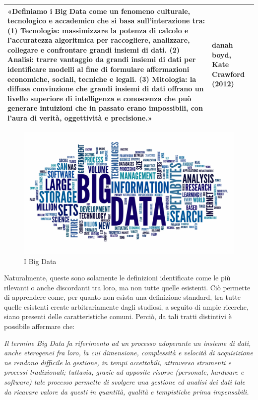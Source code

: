 \begin{longtable}{|p{11cm}|p{3cm}|}
    \hline
    «Definiamo i Big Data come un fenomeno culturale, tecnologico e accademico che si basa sull'interazione tra: (1) Tecnologia: massimizzare la potenza di calcolo e l'accuratezza algoritmica per raccogliere, analizzare, collegare e confrontare grandi insiemi di dati. (2) Analisi: trarre vantaggio da grandi insiemi di dati per identificare modelli al fine di formulare affermazioni economiche, sociali, tecniche e legali. (3) Mitologia: la diffusa convinzione che grandi insiemi di dati offrano un livello superiore di intelligenza e conoscenza che può generare intuizioni che in passato erano impossibili, con l'aura di verità, oggettività e precisione.» 
    & danah boyd, Kate Crawford (2012) \cite{routledge_big_data}\\
    \hline
\end{longtable}

\begin{figure}[H]
    \centering
    \includegraphics[width=0.8\linewidth]{figure/capitolo_2/Big_Data.pdf}
    \caption{I Big Data}
    \label{fig:Big_Data}
\end{figure}

Naturalmente, queste sono solamente le definizioni identificate come le più rilevanti o anche discordanti tra loro, ma non tutte quelle esistenti. Ciò permette di apprendere come, per quanto non esista una definizione standard, tra tutte quelle esistenti create arbitrariamente dagli studiosi, a seguito di ampie ricerche, siano presenti delle caratteristiche comuni. Perciò, da tali tratti distintivi è possibile affermare che:

\begin{center}
\textit{Il termine Big Data fa riferimento ad un processo adoperante un insieme di dati, anche eterogenei fra loro, la cui dimensione, complessità e velocità di acquisizione ne rendono difficile la gestione, in tempi accettabili, attraverso strumenti e processi tradizionali; tuttavia, grazie ad apposite risorse (personale, hardware e software) tale processo permette di svolgere una gestione ed analisi dei dati tale da ricavare valore da questi in quantità, qualità e tempistiche prima impensabili.}
\end{center}

